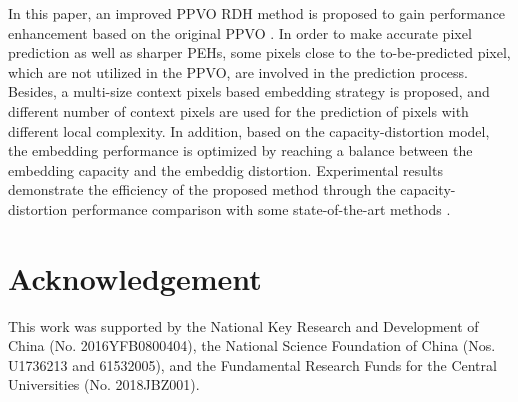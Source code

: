 \documentclass[review,3p,10pt,sort&compress]{elsarticle}
\begin{document}
In this paper, an improved PPVO RDH method is proposed to gain performance enhancement based on the original PPVO \cite{Qu2015PPVO}. In order to make accurate pixel prediction as well as sharper PEHs, some pixels close to the to-be-predicted pixel, which are not utilized in the PPVO, are involved in the prediction process. Besides, a multi-size context pixels based embedding strategy is proposed, and different number of context pixels are used for the prediction of pixels with different local complexity. In addition, based on the capacity-distortion model, the embedding performance is optimized by reaching a balance between the embedding capacity and the embeddig distortion. Experimental results demonstrate the efficiency of the proposed method through the capacity-distortion performance comparison with some state-of-the-art methods \cite{Sachnev2009Reversible,Wang2017Rate,Peng2014IPVO,Ou2014PVOk,Qu2015PPVO}.

\section*{Acknowledgement}
This work was supported by the National Key Research and Development of China (No. 2016YFB0800404), the National Science Foundation of China (Nos. U1736213 and 61532005), and the Fundamental Research Funds for the Central Universities (No. 2018JBZ001).




\end{document}
